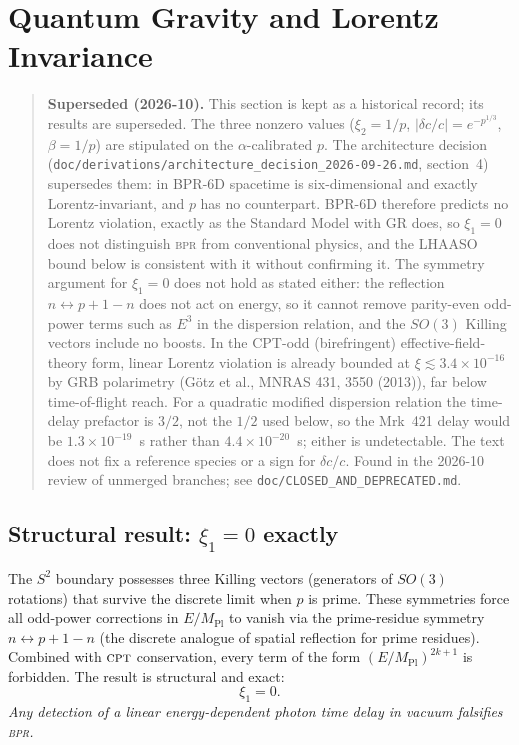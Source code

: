 \documentclass[aps,prd,twocolumn,superscriptaddress,longbibliography,nofootinbib]{revtex4-2}
\newcommand{\Stwo}{S^2}
\newcommand{\MPl}{M_{\mathrm{Pl}}}
\newcommand{\bpr}{\textsc{bpr}}
\newcommand{\CPT}{\textsc{cpt}}
\newcommand{\abs}[1]{\left|#1\right|}
\begin{document}
\section{Quantum Gravity and Lorentz Invariance}
\label{sec:qg}

\begin{quote}
\textbf{Superseded (2026-10).}  This section is kept as a historical
record; its results are superseded.  The three nonzero values
($\xi_2 = 1/p$, $\abs{\delta c/c} = e^{-p^{1/3}}$, $\beta = 1/p$) are
stipulated on the $\alpha$-calibrated $p$.  The architecture decision
(\texttt{doc/derivations/architecture\_decision\_2026-09-26.md},
section~4) supersedes them: in BPR-6D spacetime is six-dimensional
and exactly Lorentz-invariant, and $p$ has no counterpart.  BPR-6D
therefore predicts no Lorentz violation, exactly as the Standard
Model with GR does, so $\xi_1 = 0$ does not distinguish \bpr{} from
conventional physics, and the LHAASO bound below is consistent with
it without confirming it.  The symmetry argument for $\xi_1 = 0$ does
not hold as stated either: the reflection $n \leftrightarrow p+1-n$
does not act on energy, so it cannot remove parity-even odd-power
terms such as $E^3$ in the dispersion relation, and the $SO(3)$
Killing vectors include no boosts.  In the CPT-odd (birefringent)
effective-field-theory form, linear Lorentz violation is already
bounded at $\xi \lesssim 3.4\times10^{-16}$ by GRB polarimetry
(G\"otz et al., MNRAS 431, 3550 (2013)), far below time-of-flight
reach.  For a quadratic modified dispersion relation the
time-delay prefactor is $3/2$, not the $1/2$ used below, so the
Mrk~421 delay would be $1.3\times10^{-19}$~s rather than
$4.4\times10^{-20}$~s; either is undetectable.  The text does not
fix a reference species or a sign for $\delta c/c$.  Found in the
2026-10 review of unmerged branches; see
\texttt{doc/CLOSED\_AND\_DEPRECATED.md}.
\end{quote}

\subsection{Structural result: $\xi_1 = 0$ exactly}

The $\Stwo$ boundary possesses three Killing vectors (generators of $SO(3)$
rotations) that survive the discrete limit when $p$ is prime.  These
symmetries force all odd-power corrections in $E/\MPl$ to vanish via
the prime-residue symmetry $n \leftrightarrow p + 1 - n$
(the discrete analogue of spatial reflection for prime residues).
Combined with $\CPT$ conservation, every term of the form $(E/\MPl)^{2k+1}$
is forbidden.  The result is structural and exact:
\begin{equation}
\boxed{\xi_1 = 0.}
\label{eq:xi1}
\end{equation}
\textit{Any detection of a linear energy-dependent photon time delay in
vacuum falsifies \bpr.}
\end{document}
